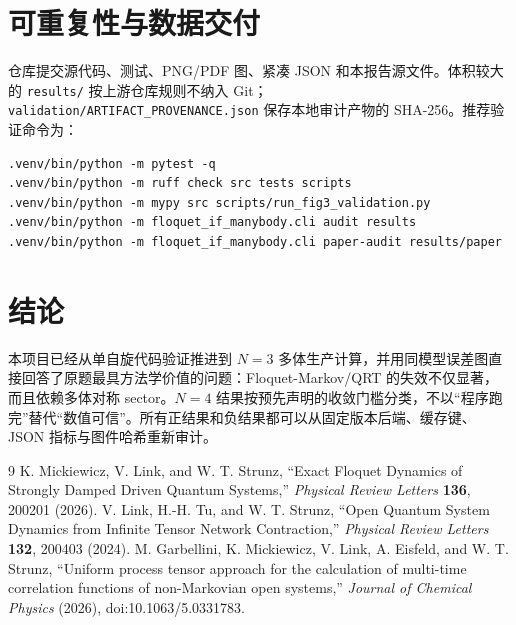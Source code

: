 \documentclass[11pt,a4paper]{ctexart}
\newcommand{\code}[1]{\texttt{#1}}
\begin{document}
\section{可重复性与数据交付}
仓库提交源代码、测试、PNG/PDF 图、紧凑 JSON 和本报告源文件。体积较大的 \code{results/} 按上游仓库规则不纳入 Git；\code{validation/ARTIFACT\_PROVENANCE.json} 保存本地审计产物的 SHA-256。推荐验证命令为：
\begin{verbatim}
.venv/bin/python -m pytest -q
.venv/bin/python -m ruff check src tests scripts
.venv/bin/python -m mypy src scripts/run_fig3_validation.py
.venv/bin/python -m floquet_if_manybody.cli audit results
.venv/bin/python -m floquet_if_manybody.cli paper-audit results/paper
\end{verbatim}

\section{结论}
本项目已经从单自旋代码验证推进到 $N=3$ 多体生产计算，并用同模型误差图直接回答了原题最具方法学价值的问题：Floquet-Markov/QRT 的失效不仅显著，而且依赖多体对称 sector。$N=4$ 结果按预先声明的收敛门槛分类，不以“程序跑完”替代“数值可信”。所有正结果和负结果都可以从固定版本后端、缓存键、JSON 指标与图件哈希重新审计。

\begin{thebibliography}{9}
K. Mickiewicz, V. Link, and W. T. Strunz,
``Exact Floquet Dynamics of Strongly Damped Driven Quantum Systems,''
\emph{Physical Review Letters} \textbf{136}, 200201 (2026).
V. Link, H.-H. Tu, and W. T. Strunz,
``Open Quantum System Dynamics from Infinite Tensor Network Contraction,''
\emph{Physical Review Letters} \textbf{132}, 200403 (2024).
M. Garbellini, K. Mickiewicz, V. Link, A. Eisfeld, and W. T. Strunz,
``Uniform process tensor approach for the calculation of multi-time correlation functions of non-Markovian open systems,''
\emph{Journal of Chemical Physics} (2026), doi:10.1063/5.0331783.
\end{thebibliography}
\end{document}
